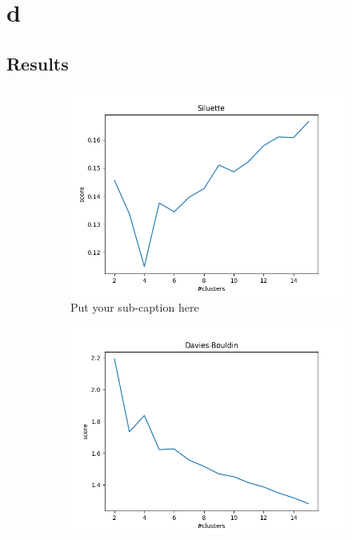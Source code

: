 \documentclass{article}
\begin{document}
\section{d}
\subsection{Results}
\begin{figure}[ht]
\begin{subfigure}{.33\textwidth}
  \centering
  \includegraphics[width=1\linewidth]{1d/Cats/siluette cats.png}  
  \caption{Put your sub-caption here}
  \label{fig:sub-first}
\end{subfigure}
\begin{subfigure}{.33\textwidth}
  \centering
  \includegraphics[width=1\linewidth]{1d/Cats/davies cats.png}  

\end{subfigure}
\end{figure}
\end{document}
